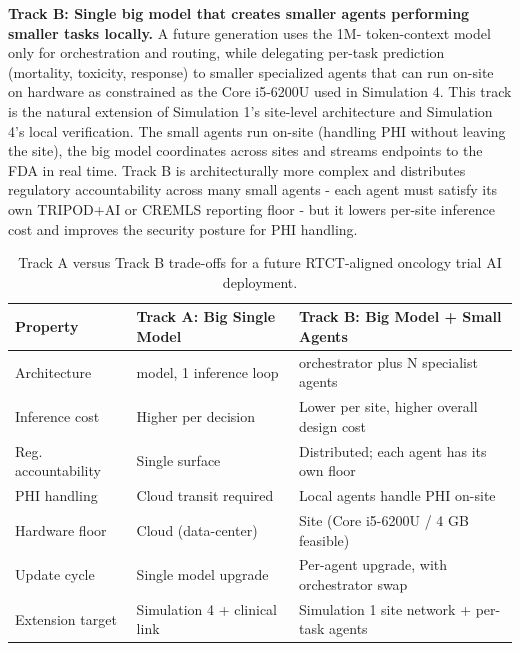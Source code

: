 \textbf{Track B: Single big model that creates smaller agents
performing smaller tasks locally.} A future generation uses the 1M-
token-context model only for orchestration and routing, while
delegating per-task prediction (mortality, toxicity, response) to
smaller specialized agents that can run on-site on hardware as
constrained as the Core i5-6200U used in Simulation 4. This track is
the natural extension of Simulation 1's site-level architecture and
Simulation 4's local verification. The small agents run on-site
(handling PHI without leaving the site), the big model coordinates
across sites and streams endpoints to the FDA in real time. Track B
is architecturally more complex and distributes regulatory
accountability across many small agents - each agent must satisfy
its own TRIPOD+AI or CREMLS reporting floor - but it lowers per-site
inference cost and improves the security posture for PHI handling.

\begin{table}[H]
\centering
\caption{Track A versus Track B trade-offs for a future RTCT-aligned
oncology trial AI deployment.}
\label{tab:future-tracks}
{\renewcommand{\arraystretch}{1.15}
\begin{tabular}{>{\raggedright\arraybackslash}p{2.6cm} >{\raggedright\arraybackslash}p{4.5cm} >{\raggedright\arraybackslash}p{4.5cm}}
\toprule
\textbf{Property} & \textbf{Track A: Big Single Model} & \textbf{Track B: Big Model + Small Agents} \\
\midrule
Architecture           & 1 model, 1 inference loop                & 1 orchestrator plus N specialist agents       \\
Inference cost         & Higher per decision                       & Lower per site, higher overall design cost     \\
Reg. accountability    & Single surface                            & Distributed; each agent has its own floor      \\
PHI handling           & Cloud transit required                    & Local agents handle PHI on-site                \\
Hardware floor         & Cloud (data-center)                       & Site (Core i5-6200U / 4 GB feasible)           \\
Update cycle           & Single model upgrade                      & Per-agent upgrade, with orchestrator swap      \\
Extension target       & Simulation 4 + clinical link              & Simulation 1 site network + per-task agents    \\
\bottomrule
\end{tabular}}
\end{table}

